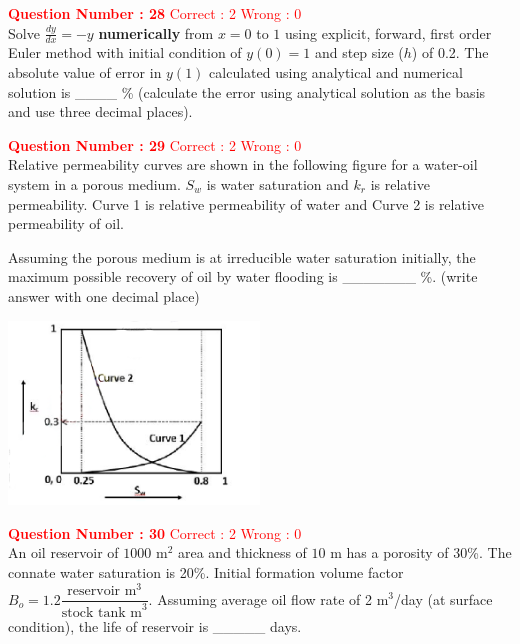 \documentclass[12pt]{article}
\begin{document}
{\textbf{\textcolor{red}{Question Number : 28}} \hfill \textcolor{red}{Correct : 2  Wrong : 0} \\[1ex]
Solve 
{\LARGE$ 
\frac{dy}{dx} = -y
$ }
\textbf{numerically} from $x = 0$ to $1$ using explicit, forward, first order Euler method with initial condition of $y(0) = 1$ and step size ($h$) of 0.2. The absolute value of error in $y(1)$ calculated using analytical and numerical solution is \_\_\_\_ \% (calculate the error using analytical solution as the basis and use three decimal places).

\vspace{3ex}


\textbf{\textcolor{red}{Question Number : 29}} \hfill \textcolor{red}{Correct : 2  Wrong : 0} \\[1ex]
Relative permeability curves are shown in the following figure for a water-oil system in a porous medium. $S_w$ is water saturation and $k_r$ is relative permeability. Curve 1 is relative permeability of water and Curve 2 is relative permeability of oil.

Assuming the porous medium is at irreducible water saturation initially, the maximum possible recovery of oil by water flooding is \_\_\_\_\_\_\_ \%. (write answer with one decimal place)

\begin{center}
    \includegraphics[width=0.5\textwidth]{Figs/GraphQ_29.png} 
\end{center}

\vspace{2ex}

\newpage

\textbf{\textcolor{red}{Question Number : 30}} \hfill \textcolor{red}{Correct : 2  Wrong : 0} \\[1ex]
An oil reservoir of $1000$ m$^2$ area and thickness of $10$ m has a porosity of 30\%. The connate water saturation is 20\%. Initial formation volume factor $B_o = 1.2 \dfrac{\text{reservoir m}^3}{\text{stock tank m}^3}$. Assuming average oil flow rate of 2 m$^3$/day (at surface condition), the life of reservoir is \_\_\_\_\_ days.

}
\end{document}
